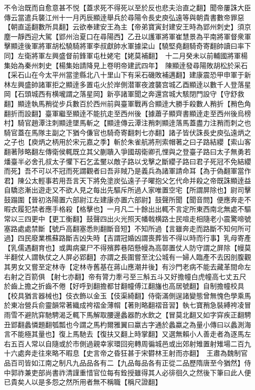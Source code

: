 不令治既而自愈意甚不悦【蓋求死不得死以至於反也悲夫治直之翻】聞帝屢誅大臣傳云當遣兵襲江州十一月丙辰顯逹舉兵於尋陽令長史庾弘遠等與朝貴書數帝罪惡【朝直遥翻數所具翻】云欲奉建安王為主【帝弟寶寅封建安王時為郢州刺史】須京塵一靜西迎大駕【郢州治夏口在尋陽西】乙丑以護軍將軍崔慧景為平南將軍督衆軍擊顯逹後軍將軍胡松驍騎將軍李叔獻帥水軍據梁山【驍堅堯翻騎奇寄翻帥讀曰率下同】左衛將軍左興盛督前鋒軍屯杜姥宅【姥莫補翻】　十二月癸未以前輔國將軍楊集始為秦州刺史【楊集始請降見上卷明帝建武四年】　陳顯逹發尋陽敗胡松於采石【采石山在今太平州當塗縣北八十里山下有采石磯敗補邁翻】建康震恐甲申軍于新林左興盛帥諸軍拒之顯逹多置屯火於岸側潜軍夜渡襲宫城乙酉顯逹以數千人登落星岡【石頭城西有横壠謂之落星岡】新亭諸軍聞之奔還宫城大駭閉門設守【守舒救翻】顯逹執馬矟從步兵數百於西州前與臺軍戰再合顯逹大勝手殺數人矟折【矟色角翻折而設翻】臺軍繼至顯逹不能抗走至西州後【據蕭子顯齊書顯逹走至西州後烏榜村】騎官趙潭注刺顯逹墜馬斬之【顯逹傳云潭注矟刺顯逹落馬蓋盡力注矟而刺之也騎官蓋在馬隊主副之下猶今傔官也騎奇寄翻刺七亦翻】諸子皆伏誅長史庾弘遠炳之之子也【庾炳之柄用於宋元嘉之季】斬於朱雀航將刑索帽著之曰子路結纓【索山客翻著陟略翻左傳衛侯輒既立其父蒯聵入爭國刼衛卿孔悝與之登臺子路曰太子無勇若燔臺半必舍孔叔太子懼下石乞孟黶以敵子路以戈擊之斷纓子路曰君子死冠不免結纓而死】吾不可以不冠而死謂觀者曰吾非賊乃是義兵為諸軍請命耳【為于偽翻軍當作君】陳公太輕事若用吾言天下將免塗炭弘遠子子曜抱父乞代命并殺之帝既誅顯逹益自驕恣漸出遊走又不欲人見之每出先驅斥所過人家唯置空宅【所謂屏除也】尉司擊鼓蹋圍【晉初洛陽置六部尉江左建康亦置六部尉】鼓聲所聞【聞音問】便應奔走不暇衣履犯禁者應手格殺【格擊也】一月凡二十餘出出輒不言定所東西南北無處不驅常以三四更中【更工衡翻】鼓聲四出火光照天幡戟横路士民喧走相隨老小震驚啼號塞路處處禁斷【號戶高翻塞悉則翻斷音短】不知所過【言雖奔走而路斷不知何所可過】四民廢業樵蘇路斷吉凶失時【吉謂冠婚凶謂喪葬皆不得以時而行事】乳母寄產【乳儒遇翻育也】或輿病棄尸不得殯葬巷陌懸幔為高鄣置仗人防守謂之屏除【幔莫半翻仗人謂執仗之人屏必郢翻】亦謂之長圍嘗至沈公城有一婦人臨產不去因剖腹觀其男女又嘗至定林寺【定林寺舊基在蔣山應潮井後】有沙門老病不能去藏革間命左右射之百箭俱【射七亦翻】帝有膂力牽弓至三斛五斗又好擔幢白虎幢高七丈五尺於齒上擔之折齒不倦【好呼到翻擔都甘翻幢傅江翻旛也高居號翻】自制擔幢校具【校具猶言器械也】伎衣飾以金玉【伎渠綺翻】侍衛滿側逞諸變態曾無愧色學乘馬於東冶營兵俞靈韻常著織成袴褶金薄㡌【著則略翻褶音習】執七寶矟急裝縛袴凌冒雨雪不避阬穽馳騁渴乏輒下馬解取腰邊蠡器酌水飲之【冒莫北翻又如字穽疾正翻騁丑郢翻蠡憐題翻瓠瓢也今謂之馬杓爾雅翼曰蠃古字通於蠡蠃之為量小傳曰以蠡測海言不能極其量也】復上馬馳去【復扶又翻上時掌翻】又選無賴小人善走者為逐馬左右五百人常以自隨或於市側過親幸家環回宛轉周徧城邑或出郊射雉置射雉場二百九十六處奔走往來略不暇息【史言帝之昏狂甚于宋欎林王射而亦翻】　王肅為魏制官品百司皆如江南之制凡九品品各有二【九品每品各有正從二品歷隋唐至今猶然】侍中郭祚兼吏部尚書祚清謹重惜官位每有銓授雖得其人必徘徊久之然後下筆曰此人便已貴矣人以是多怨之然所用者無不稱職【稱尺證翻】

